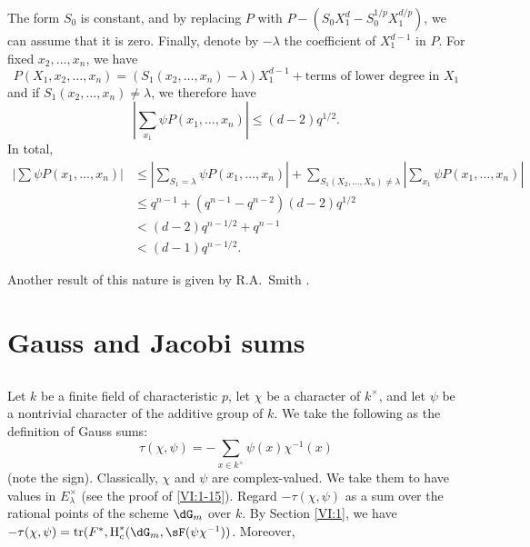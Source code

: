 The form $S_0$ is constant, and by replacing $P$ with 
$P-(S_0 X_1^d -S_0^{1/p} X_1^{d/p})$, we can assume that it is zero. 
Finally, denote by $-\lambda$ the coefficient of $X_1^{d-1}$ in $P$. For fixed 
$x_2,\dots,x_n$, we have 
\[
  P(X_1,x_2,\dots,x_n) = (S_1(x_2,\dots,x_n)-\lambda) X_1^{d-1} + \text{terms of lower degree in $X_1$} 
\]
and if $S_1(x_2,\dots,x_n)\ne \lambda$, we therefore have 
\[
  \left| \sum_{x_1} \psi P(x_1,\dots,x_n)\right| \leqslant (d-2) q^{1/2} \text{.} 
\]
In total, 
\begin{align*}
  \left|\sum \psi P(x_1,\dots,x_n)\right| 
    &\leqslant \left|\sum_{S_1=\lambda} \psi P(x_1,\dots,x_n)\right| + \sum_{S_1(X_2,\dots,X_n)\ne\lambda} \left| \sum_{x_1} \psi P(x_1,\dots,x_n)\right| \\
    &\leqslant q^{n-1} + (q^{n-1}-q^{n-2})(d-2) q^{1/2} \\
    &< (d-2) q^{n-1/2} + q^{n-1} \\
    &< (d-1) q^{n-1/2} \text{.}
\end{align*}

Another result of this nature is given by R.A.\ Smith 
\cite{sm70}. 










\section{Gauss and Jacobi sums}\label{VI:4}





\subsection{}\label{VI:4-1}

Let $k$ be a finite field of characteristic $p$, let $\chi$ be a character of 
$k^\times$, and let $\psi$ be a nontrivial character of the additive group of $k$. 
We take the following as the definition of Gauss sums: 
\begin{equation*}\tag{4.1.1}\label{VI:eq:4-1-1}
  \tau(\chi,\psi) = -\sum_{x\in k^\times} \psi(x) \chi^{-1}(x) 
\end{equation*}
(note the sign). Classically, $\chi$ and $\psi$ are complex-valued. 
We take them to have values in $E_\lambda^\times$ (see the proof of 
\ref{VI:1-15}). Regard $-\tau(\chi,\psi)$ as a sum over the rational 
points of the scheme $\dG_m$ over $k$. By Section \ref{VI:1}, 
we have $-\tau(\chi,\psi) = \tr(F^\ast,\h_c^\ast(\dG_m,\sF(\psi \chi^{-1}))$. Moreover,

